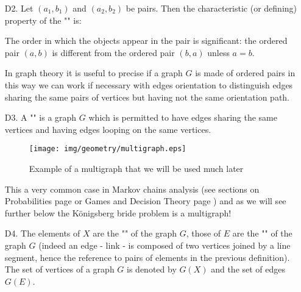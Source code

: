 {\begin{enumerate}
	\begin{figure}[H]
		\centering
		\texttt{[image: img/geometry/graph\_vocabular.eps]}
	\end{figure}
	
	\begin{tcolorbox}[title=Remark,colframe=black,arc=10pt]
	A graph is often denoted in English $G = (E, V)$ where $E$ is the first letter of the word "edges" and $V$ the first letter of the word "vertices".
	\end{tcolorbox}	
	
	\item[D2.] Let $(a_1, b_1)$ and $(a_2, b_2)$ be pairs. Then the characteristic (or defining) property of the "" is:
		
		 The order in which the objects appear in the pair is significant: the ordered pair $(a, b)$ is different from the ordered pair $(b, a)$ unless $a = b$. 
		 
		In graph theory it is useful to precise if a graph $G$ is made of ordered pairs in this way we can work if necessary with edges orientation to distinguish edges sharing the same pairs of vertices but having not the same orientation path.
	
	\item[D3.] A "" is a graph $G$ which is permitted to have edges sharing the same vertices and having edges looping on the same vertices.
	
	\begin{figure}[H]
	\centering
	\texttt{[image: img/geometry/multigraph.eps]}
	\caption{Example of a multigraph that we will be used much later}
	\end{figure}
	
	\begin{tcolorbox}[title=Remark,colframe=black,arc=10pt]
This a very common case in Markov chains analysis (see sections on Probabilities page \pageref{markov chains} or Games and Decision Theory page \pageref{markov decision process}) and as we will see further below the Königsberg bride problem is a multigraph!
	\end{tcolorbox}	 

	\item[D4.] The elements of $X$ are the "" of the graph $G$, those of $E$ are the "" of the graph $G$ (indeed an edge - link - is composed of two vertices joined by a line segment, hence the reference to pairs of elements in the previous definition). The set of vertices of a graph $G$ is denoted by $G (X)$ and the set of edges $G (E)$.
	

\end{enumerate}}
